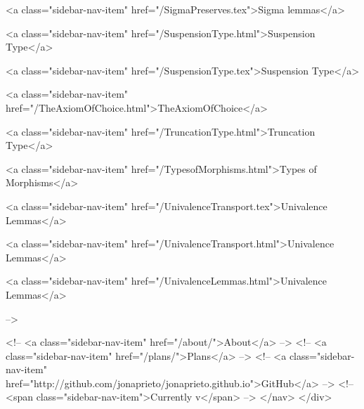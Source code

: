       
    
      
        
          <a class="sidebar-nav-item" href="/SigmaPreserves.tex">Sigma lemmas</a>
        
      
    
      
        
          <a class="sidebar-nav-item" href="/SuspensionType.html">Suspension Type</a>
        
      
    
      
        
          <a class="sidebar-nav-item" href="/SuspensionType.tex">Suspension Type</a>
        
      
    
      
        
          <a class="sidebar-nav-item" href="/TheAxiomOfChoice.html">TheAxiomOfChoice</a>
        
      
    
      
        
          <a class="sidebar-nav-item" href="/TruncationType.html">Truncation Type</a>
        
      
    
      
        
          <a class="sidebar-nav-item" href="/TypesofMorphisms.html">Types of Morphisms</a>
        
      
    
      
        
          <a class="sidebar-nav-item" href="/UnivalenceTransport.tex">Univalence Lemmas</a>
        
      
    
      
        
          <a class="sidebar-nav-item" href="/UnivalenceTransport.html">Univalence Lemmas</a>
        
      
    
      
        
          <a class="sidebar-nav-item" href="/UnivalenceLemmas.html">Univalence Lemmas</a>
        
      
     -->

    <!-- <a class="sidebar-nav-item" href="/about/">About</a> -->
    <!-- <a class="sidebar-nav-item" href="/plans/">Plans</a> -->
    <!-- <a class="sidebar-nav-item" href="http://github.com/jonaprieto/jonaprieto.github.io">GitHub</a> -->
    <!-- <span class="sidebar-nav-item">Currently v</span> -->
  </nav>
</div>

